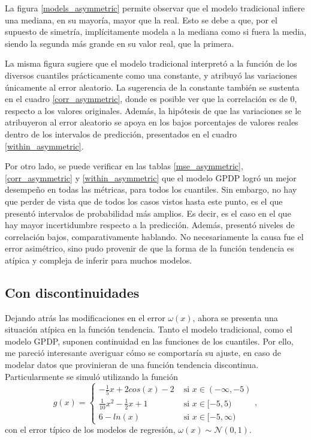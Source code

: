 La figura \ref{models_asymmetric} permite observar que el modelo tradicional infiere una mediana, en su mayor\'ia, mayor que la real. Esto se debe a que, por el supuesto de simetr\'ia, impl\'icitamente modela a la mediana como si fuera la media, siendo la segunda m\'as grande en su valor real, que la primera. 

La misma figura sugiere que el modelo tradicional interpret\'o a la funci\'on de los diversos cuantiles pr\'acticamente como una constante, y atribuy\'o las variaciones \'unicamente al error aleatorio. La sugerencia de la constante tambi\'en se sustenta en el cuadro \ref{corr_asymmetric}, donde es posible ver que la correlaci\'on es de 0, respecto a los valores originales. Adem\'as, la hip\'otesis de que las variaciones se le atribuyeron al error aleatorio se apoya en los bajos porcentajes de valores reales dentro de los intervalos de predicci\'on, presentados en el cuadro \ref{within_asymmetric}.

Por otro lado, se puede verificar en las tablas \ref{mse_asymmetric}, \ref{corr_asymmetric} y \ref{within_asymmetric} que el modelo GPDP logr\'o un mejor desempeño en todas las m\'etricas, para todos los cuantiles. Sin embargo, no hay que perder de vista que de todos los casos vistos hasta este punto, es el que present\'o intervalos de probabilidad m\'as amplios. Es decir, es el caso en el que hay mayor incertidumbre respecto a la predicci\'on. Adem\'as, present\'o niveles de correlaci\'on bajos, comparativamente hablando. No necesariamente la causa fue el error asim\'etrico, sino pudo provenir de que la forma de la funci\'on tendencia es at\'ipica y compleja de inferir para muchos modelos.

\subsection{Con discontinuidades}

Dejando atr\'as las modificaciones en el error $\omega(x)$, ahora se presenta una situaci\'on at\'ipica en la funci\'on tendencia. Tanto el modelo tradicional, como el modelo GPDP, suponen continuidad en las funciones de los cuantiles. Por ello, me pareci\'o interesante averiguar c\'omo se comportar\'ia su ajuste, en caso de modelar datos que provinieran de una funci\'on tendencia discontinua. Particularmente se simul\'o utilizando la funci\'on
\begin{equation*}
g(x) = 
\begin{cases}
   - \frac{1}{5} x + 2cos(x) - 2 &\text{ si } x \in (-\infty, -5) \\
   \frac{1}{10} x^2 - \frac{1}{2}x + 1 &\text{ si } x \in [-5, 5) \\
   6 - ln(x) &\text{ si } x \in [-5, \infty)
\end{cases},
\end{equation*}
con el error t\'ipico de los modelos de regresi\'on, $\omega(x) \sim \mathcal{N}(0,1)$.

